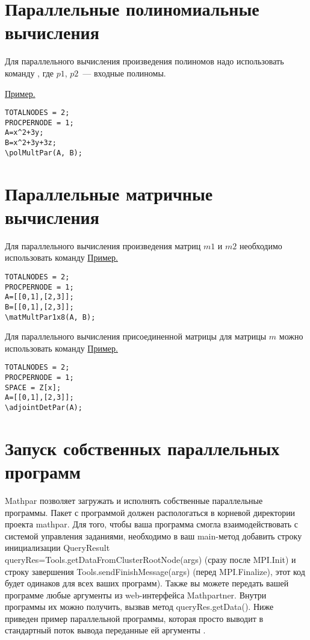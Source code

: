 \section{Параллельные полиномиальные вычисления}
  Для параллельного вычисления произведения полиномов надо использовать команду 
  ,  где $p1$,  $p2$~--- входные полиномы.  

\underline{Пример. }
\begin{verbatim}
TOTALNODES = 2;
PROCPERNODE = 1;
A=x^2+3y;
B=x^2+3y+3z;
\polMultPar(A, B);
\end{verbatim}

      
\section{Параллельные матричные вычисления}
  Для параллельного вычисления произведения матриц $m1$ и $m2$ необходимо использовать команду 
  \underline{Пример. }
\begin{verbatim}
TOTALNODES = 2;
PROCPERNODE = 1;
A=[[0,1],[2,3]];
B=[[0,1],[2,3]];
\matMultPar1x8(A, B);
\end{verbatim}
 
  Для параллельного вычисления присоединенной матрицы для матрицы $m$ можно использовать команду 
   \underline{Пример. }
\begin{verbatim}
TOTALNODES = 2;
PROCPERNODE = 1;
SPACE = Z[x];
A=[[0,1],[2,3]];   
\adjointDetPar(A);
\end{verbatim}
 
 
\section{Запуск собственных параллельных программ}
  Mathpar позволяет загружать и исполнять собственные параллельные программы.
  Пакет с программой должен распологаться в корневой директории проекта mathpar.
  Для того, чтобы ваша программа смогла взаимодействовать с системой управления заданиями,
  необходимо в ваш main-метод добавить строку инициализации QueryResult queryRes=Tools.getDataFromClusterRootNode(args)
 (сразу после MPI.Init) и  строку завершения Tools.sendFinishMessage(args) (перед MPI.Finalize),
  этот код будет одинаков для всех ваших программ).   Также вы можете передать вашей программе 
  любые аргументы из web-интерфейса Mathpartner.  Внутри программы их можно получить, вызвав 
метод queryRes.getData(). Ниже приведен пример параллельной программы, 
которая просто выводит в стандартный поток вывода  переданные ей аргументы .


